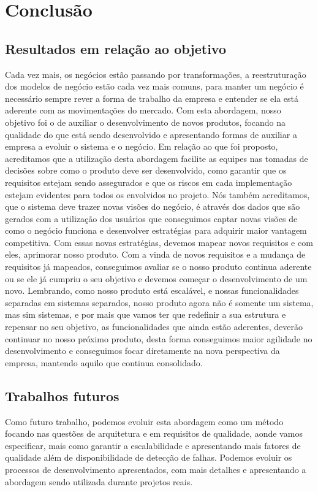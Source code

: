 \part{Conclusão}
  \chapter{Resultados em relação ao objetivo}
    Cada vez mais, os negócios estão passando por transformações, a reestruturação
    dos modelos de negócio estão cada vez mais comuns, para manter um negócio é
    necessário sempre rever a forma de trabalho da empresa e entender se ela está
    aderente com as movimentações do mercado. \newline
    Com esta abordagem, nosso objetivo foi o de auxiliar o desenvolvimento de novos
    produtos, focando na qualidade do que está sendo desenvolvido e apresentando
    formas de auxiliar a empresa a evoluir o sistema e o negócio. Em relação
    ao que foi proposto, acreditamos que a utilização desta abordagem facilite as
    equipes nas tomadas de decisões sobre como o produto deve ser desenvolvido,
    como garantir que os requisitos estejam sendo assegurados e que os riscos em
    cada implementação estejam evidentes para todos os envolvidos no projeto.\newline
    Nós também acreditamos, que o sistema deve trazer novas visões do negócio, é
    através dos dados que são gerados com a utilização dos usuários que conseguimos
    captar novas visões de como o negócio funciona e desenvolver estratégias
    para adquirir maior vantagem competitiva. Com essas novas estratégias, devemos
    mapear novos requisitos e com eles, aprimorar nosso produto. \newline
    Com a vinda de novos requisitos e a mudança de requisitos já mapeados, conseguimos
    avaliar se o nosso produto continua aderente ou se ele já cumpriu o seu objetivo
    e devemos começar o desenvolvimento de um novo. Lembrando, como nosso produto
    está escalável, e nossas funcionalidades separadas em sistemas separados, nosso
    produto agora não é somente um sistema, mas sim sistemas, e por mais que vamos
    ter que redefinir a sua estrutura e repensar no seu objetivo, as funcionalidades
    que ainda estão aderentes, deverão continuar no nosso próximo produto, desta
    forma conseguimos maior agilidade no desenvolvimento e conseguimos focar
    diretamente na nova perspectiva da empresa, mantendo aquilo que continua
    consolidado.

  \chapter{Trabalhos futuros}
    Como futuro trabalho, podemos evoluir esta abordagem como um método focando
    nas questões de arquitetura e em requisitos de qualidade, aonde vamos especificar,
    mais como garantir a escalabilidade e apresentando mais fatores de qualidade
    além de disponibilidade de detecção de falhas. Podemos evoluir os processos de
    desenvolvimento apresentados, com mais detalhes e apresentando a abordagem sendo
    utilizada durante projetos reais.
